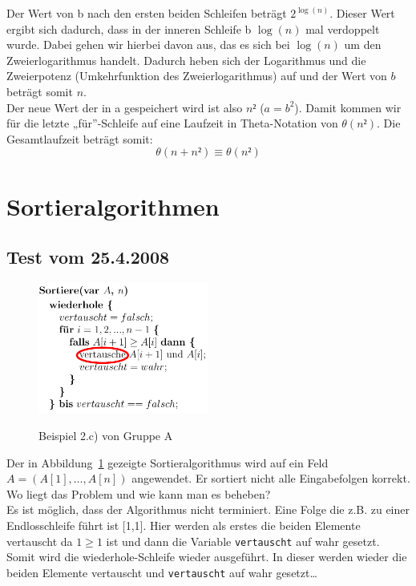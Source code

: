 \documentclass[a4paper, 12pt]{article}
\begin{document}
Der Wert von b nach den ersten beiden Schleifen beträgt $2^{\log(n)}$. Dieser
Wert ergibt sich dadurch, dass in der inneren Schleife b $\log(n)$ mal
verdoppelt wurde. Dabei gehen wir hierbei davon aus, das es sich bei $\log(n)$
um den Zweierlogarithmus handelt. Dadurch heben sich der Logarithmus und die
Zweierpotenz (Umkehrfunktion des Zweierlogarithmus) auf und der Wert von $b$
beträgt somit $n$.\\

Der neue Wert der in a gespeichert wird ist also $n²$ ($a=b^2$). Damit kommen
wir für die letzte „für”-Schleife auf eine Laufzeit in Theta-Notation von
$θ(n²)$. Die Gesamtlaufzeit beträgt somit: $$θ\left(n+n²\right) \equiv
θ\left(n²\right)$$

\section{Sortieralgorithmen}

\subsection{Test vom 25.4.2008}

\begin{figure}[htbp]
	\caption{Beispiel 2.c) von Gruppe A}
	\vskip 0.2cm
	\centering
	\includegraphics[width=0.5\textwidth]{Figures/Test_2008-04-25_2Ab}
	\label{figure:Test_2008-04-25_2Ab}
\end{figure}

Der in Abbildung~\ref{figure:Test_2008-04-25_2Ab} gezeigte Sortieralgorithmus
wird auf ein Feld $A=\left(A[1],\dots,A[n]\right)$ angewendet. Er sortiert
nicht alle Eingabefolgen korrekt. Wo liegt das Problem und wie kann man es
beheben?\\

Es ist möglich, dass der Algorithmus nicht terminiert. Eine Folge die z.B. zu
einer Endlosschleife führt ist [1,1]. Hier werden als erstes die beiden
Elemente vertauscht da $1≥1$ ist und dann die Variable \texttt{vertauscht} auf
wahr gesetzt. Somit wird die wiederhole-Schleife wieder ausgeführt. In dieser
werden wieder die beiden Elemente vertauscht und \texttt{vertauscht} auf wahr
gesetzt\dots\\
\end{document}
